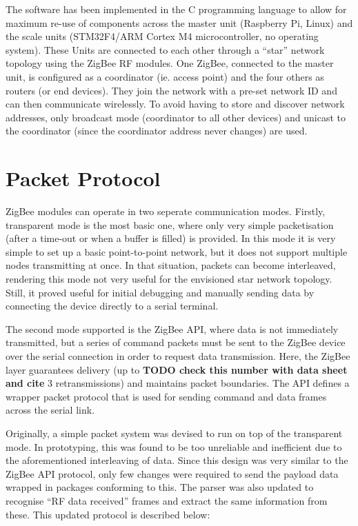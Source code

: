 The software has been implemented in the C programming language to allow for maximum re-use of components across the master unit (Raspberry Pi, Linux) and the scale units (STM32F4/ARM Cortex M4 microcontroller, no operating system). These Units are connected to each other through a ``star'' network topology using the ZigBee RF modules. One ZigBee, connected to the master unit, is configured as a coordinator (ie. access point) and the four others as routers (or end devices). They join the network with a pre-set network ID and can then communicate wirelessly. To avoid having to store and discover network addresses, only broadcast mode (coordinator to all other devices) and unicast to the coordinator (since the coordinator address never changes) are used.

\section{Packet Protocol}
\label{section:software-impl-packets}
ZigBee modules can operate in two seperate communication modes. Firstly, transparent mode is the most basic one, where only very simple packetisation (after a time-out or when a buffer is filled) is provided. In this mode it is very simple to set up a basic point-to-point network, but it does not support multiple nodes transmitting at once. In that situation, packets can become interleaved, rendering this mode not very useful for the envisioned star network topology. Still, it proved useful for initial debugging and manually sending data by connecting the device directly to a serial terminal.

The second mode supported is the ZigBee API, where data is not immediately transmitted, but a series of command packets must be sent to the ZigBee device over the serial connection in order to request data transmission. Here, the ZigBee layer guarantees delivery (up to \textbf{TODO check this number with data sheet and cite} 3 retransmissions) and maintains packet boundaries. The API defines a wrapper packet protocol that is used for sending command and data frames across the serial link\cite[page 35]{xbee-datasheet}.

Originally, a simple packet system was devised to run on top of the transparent mode. In prototyping, this was found to be too unreliable and inefficient due to the aforementioned interleaving of data. Since this design was very similar to the ZigBee API protocol, only few changes were required to send the payload data wrapped in packages conforming to this. The parser was also updated to recognise ``RF data received'' frames and extract the same information from these. This updated protocol is described below:

